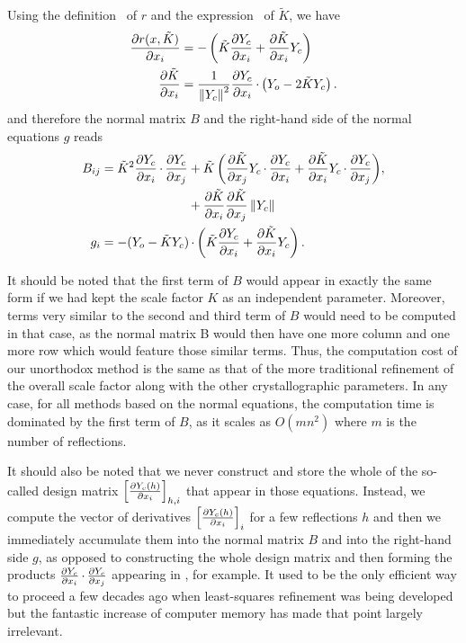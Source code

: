 \documentclass[pdf]{iucr}
\begin{document}
Using the definition~ of $r$ and the expression~ of $\tilde{K}$, we have
\begin{align}
\frac{\partial r(x, \tilde{K})}{\partial x_i} &= -\left( \tilde{K}\frac{\partial Y_c}{\partial x_i} + \frac{\partial \tilde{K}}{\partial x_i} Y_c \right) \\
\frac{\partial \tilde{K}}{\partial x_i} &= \frac{1}{\left\| Y_c \right\|^2}\frac{\partial Y_c}{\partial x_i} \operatorname{\cdot} \left(Y_o - 2 \tilde{K}Y_c \right).
\end{align}
and therefore the normal matrix $B$ and the right-hand side of the normal equations $g$ reads
\begin{align}
B_{ij} &= \begin{aligned}[t] \tilde{K}^2\frac{\partial Y_c}{\partial x_i} \operatorname{\cdot} \frac{\partial Y_c}{\partial x_j} 
&+ \tilde{K} \left( \frac{\partial \tilde{K}}{\partial x_j}Y_c \operatorname{\cdot} \frac{\partial Y_c}{\partial x_i}
+ \frac{\partial \tilde{K}}{\partial x_i}Y_c \operatorname{\cdot} \frac{\partial Y_c}{\partial x_j} \right) \nonumber\\
&+ \frac{\partial \tilde{K}}{\partial x_i}\frac{\partial \tilde{K}}{\partial x_j} \left\| Y_c \right\|
\end{aligned},
\label{eqn:normalmatrixwithoutscalefactor} \\
g_i &= - (Y_o - \tilde{K}Y_c) \operatorname{\cdot} \left( \tilde{K}\frac{\partial Y_c}{\partial x_i} + \frac{\partial \tilde{K}}{\partial x_i} Y_c \right).
\end{align}

It should be noted that the first term of $B$ would appear in exactly the same form if we had kept the scale factor $K$ as an independent parameter. Moreover, terms very similar to the second and third term of $B$ would need to be computed in that case, as the normal matrix B would then have one more column and one more row which would feature those similar terms. Thus, the computation cost of our unorthodox method is the same as that of the more traditional refinement of the overall scale factor along with the other crystallographic parameters. In any case, for all methods based on the normal equations, the computation time is dominated by the first term of $B$, as it scales as $O(mn^2)$ where $m$ is the number of reflections.

It should also be noted that we never construct and store the whole of the so-called design matrix $\left[ \frac{\partial Y_c(h)}{\partial x_i} \right]_{h,i}$ that appear in those equations. Instead, we compute the vector of derivatives $\left[ \frac{\partial Y_c(h)}{\partial x_i} \right]_i$ for a few reflections $h$ and then we immediately accumulate them into the normal matrix $B$ and into the right-hand side $g$, as opposed to constructing the whole design matrix and then forming the products $\frac{\partial Y_c}{\partial x_i} \operatorname{\cdot} \frac{\partial Y_c}{\partial x_j}$ appearing in , for example. It used to be the only efficient way to proceed a few decades ago when least-squares refinement was being developed but the fantastic increase of computer memory has made that point largely irrelevant.
\end{document}
